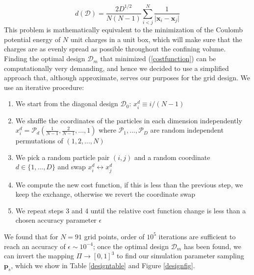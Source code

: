 \documentclass[reprint,aps,prd,superscriptaddress,showkeys,showpacs]{revtex4-1}
\begin{document}
\begin{equation}
\label{costfunction}
d(\mathcal{D}) = \frac{2D^{1/2}}{N(N-1)}\sum_{i<j}^N\frac{1}{\vert\mathbf{x}_i-\mathbf{x}_j\vert}
\end{equation} 
%
This problem is mathematically equivalent to the minimization of the Coulomb potential energy of $N$ unit charges in a unit box, which will make sure that the charges are as evenly spread as possible throughout the confining volume. Finding the optimal design $\mathcal{D}_m$ that minimized (\ref{costfunction}) can be computationally very demanding, and hence we decided to use a simplified approach that, although approximate, serves our purposes for the grid design. We use an iterative procedure:
\begin{enumerate}
\item We start from the diagonal design $\mathcal{D}_0$: $x_i^d\equiv i/(N-1)$
\item We shuffle the coordinates of the particles in each dimension independently $x_i^d = \mathcal{P}_d\left(\frac{1}{N-1},\frac{2}{N-1},...,1\right)$ where $\mathcal{P}_1,...,\mathcal{P}_D$ are random independent permutations of $(1,2,...,N)$
\item We pick a random particle pair $(i,j)$ and a random coordinate $d\in\{1,...,D\}$ and swap $x_i^d\leftrightarrow x_j^d$
\item We compute the new cost function, if this is less than the previous step, we keep the exchange, otherwise we revert the coordinate swap
\item We repeat steps 3 and 4 until the relative cost function change is less than a chosen accuracy parameter $\epsilon$ 
\end{enumerate}
%
We found that for $N=91$ grid points, order of $10^5$ iterations are sufficient to reach an accuracy of $\epsilon\sim10^{-4}$; once the optimal design $\mathcal{D}_m$ has been found, we can invert the mapping $\Pi\rightarrow[0,1]^3$ to find our simulation parameter sampling $\mathbf{p}_s$, which we show in Table \ref{designtable} and Figure \ref{designfig}.
%
\end{document}
